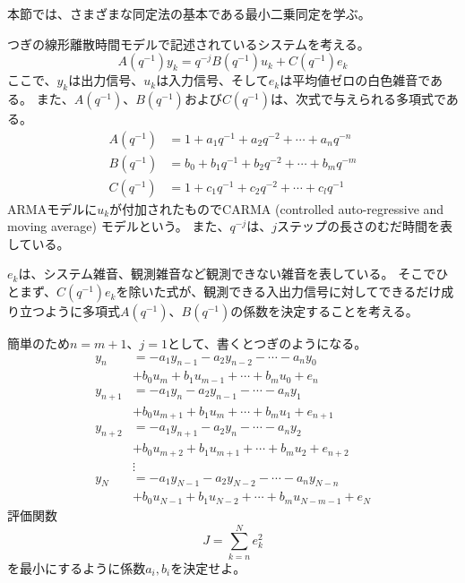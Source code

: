 \documentclass[a4paper,twocolumn]{jarticle}
\begin{document}
本節では、さまざまな同定法の基本である最小二乗同定を学ぶ\cite{mori2022digital}。

つぎの線形離散時間モデルで記述されているシステムを考える。
\[
  A(q^{-1})y_k=q^{-j}B(q^{-1})u_k+C(q^{-1})e_k
\]
ここで、$y_k$は出力信号、$u_k$は入力信号、そして$e_k$は平均値ゼロの白色雑音である。
また、$A(q^{-1})$、$B(q^{-1})$および$C(q^{-1})$は、次式で与えられる多項式である。
\begin{align*}
  A(q^{-1})&=1+a_1q^{-1}+a_2q^{-2}+\cdots+a_nq^{-n}\\
  B(q^{-1})&=b_0+b_1q^{-1}+b_2q^{-2}+\cdots+b_mq^{-m}\\
  C(q^{-1})&=1+c_1q^{-1}+c_2q^{-2}+\cdots+c_lq^{-1}
\end{align*}
ARMAモデルに$u_k$が付加されたものでCARMA (controlled auto-regressive and moving average) モデルという。
また、$q^{-j}$は、$j$ステップの長さのむだ時間を表している。

$e_k$は、システム雑音、観測雑音など観測できない雑音を表している。
そこでひとまず、$C(q^{-1})e_k$を除いた式が、観測できる入出力信号に対してできるだけ成り立つように多項式$A(q^{-1})$、$B(q^{-1})$の係数を決定することを考える。

簡単のため$n=m+1$、$j=1$として、書くとつぎのようになる。
\begin{align*}
  y_n&=-a_1y_{n-1}-a_2y_{n-2}-\cdots-a_ny_0\\
  &+b_0u_m+b_1u_{m-1}+\cdots+b_mu_0+e_n\\
  y_{n+1}&=-a_1y_n-a_2y_{n-1}-\cdots-a_ny_1\\
  &+b_0u_{m+1}+b_1u_m+\cdots+b_mu_1+e_{n+1}\\
  y_{n+2}&=-a_1y_{n+1}-a_2y_{n}-\cdots-a_ny_2\\
  &+b_0u_{m+2}+b_1u_{m+1}+\cdots+b_mu_2+e_{n+2}\\
  &\vdots\\
  y_N&=-a_1y_{N-1}-a_2y_{N-2}-\cdots-a_ny_{N-n}\\
  &+b_0u_{N-1}+b_1u_{N-2}+\cdots+b_mu_{N-m-1}+e_N
\end{align*}
評価関数
\[
  J=\sum_{k=n}^Ne_k^2
\]
を最小にするように係数$a_i,b_i$を決定せよ。
\end{document}
